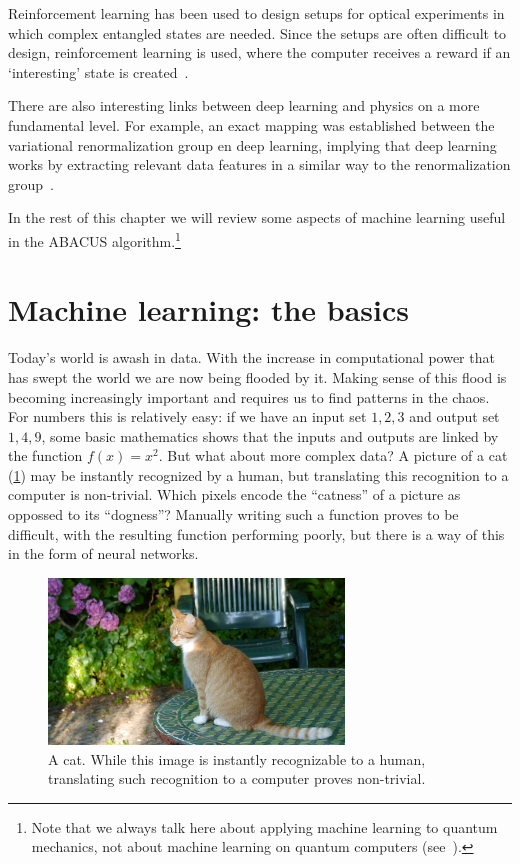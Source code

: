 \documentclass[11pt, a4paper]{report} %
\begin{document}
Reinforcement learning has been used to design setups for optical experiments in which complex entangled states are needed.
Since the setups are often difficult to design, reinforcement learning is used, where the computer receives a reward if an `interesting' state is created~\cite{Dunjko2017}.

There are also interesting links between deep learning and physics on a more fundamental level.
For example, an exact mapping was established between the variational renormalization group en deep learning, implying that deep learning works by extracting relevant data features in a similar way to the renormalization group~\cite{Mehta2014}. 

In the rest of this chapter we will review some aspects of machine learning useful in the ABACUS algorithm.\footnote{Note that we always talk here about applying machine learning to quantum mechanics, not about machine learning on quantum computers (see~\cite{Dunjko2017}).}


\section{Machine learning: the basics}
Today's world is awash in data.
With the increase in computational power that has swept the world we are now being flooded by it.
Making sense of this flood is becoming increasingly important and requires us to find patterns in the chaos.
For numbers this is relatively easy: if we have an input set \(1,2,3\) and output set \(1,4,9\), some basic mathematics shows that the inputs and outputs are linked by the function \(f(x)=x^2\).
But what about more complex data?
A picture of a cat (\cref{fig:cat}) may be instantly recognized by a human, but translating this recognition to a computer is non-trivial.
Which pixels encode the ``catness'' of a picture as oppossed to its ``dogness''?
Manually writing such a function proves to be difficult, with the resulting function performing poorly, but there is a way of this in the form of neural networks. 

\begin{figure}[tb!]
  \centering
  \includegraphics[draft,width=0.7\textwidth]{cat.jpg}
  \caption{A cat. While this image is instantly recognizable to a human, translating such recognition to a computer proves non-trivial.}
  \label{fig:cat}
\end{figure}
\end{document}
